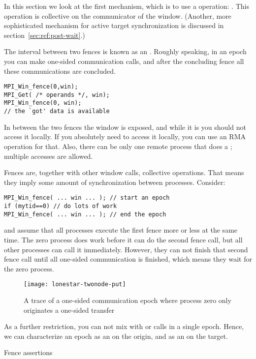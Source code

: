 In this section we look at the first mechanism,
which is to use a  operation: .
This operation is collective on the communicator of the window.
(Another, more sophisticated mechanism for active target synchronization
is discussed in section~\ref{sec:ref:post-wait}.)

The interval between two fences is known as an .
Roughly speaking, in an epoch you can make one-sided communication calls,
and after the concluding fence all these communications are concluded.
\begin{lstlisting}
MPI_Win_fence(0,win);
MPI_Get( /* operands */, win);
MPI_Win_fence(0, win);
// the `got' data is available
\end{lstlisting}
In between the two fences the window is exposed,
and while it is you should not access it locally.
If you absolutely need to access it
locally, you can use an \ac{RMA} operation for that. Also, there can be only one
remote process that does a ; multiple  accesses are allowed.

Fences are, together with other window calls, collective operations. That means they 
imply some amount of synchronization between processes. Consider:
\begin{lstlisting}
MPI_Win_fence( ... win ... ); // start an epoch
if (mytid==0) // do lots of work
MPI_Win_fence( ... win ... ); // end the epoch
\end{lstlisting}
and assume that all processes execute the first fence more or less at the same time.
The zero process does work before it can do the second fence call, but all other
processes can call it immediately. However, they can not finish that second fence call
until all one-sided communication is finished, which means they wait for the zero process.

\begin{figure}[ht]
  \texttt{[image: lonestar-twonode-put]}%
  \caption{A trace of a one-sided communication epoch where process zero only originates
  a one-sided transfer}
  \label{fig:putblock}
\end{figure}

As a further restriction, you can not mix  with 
or  calls in a single epoch. Hence, we can
characterize an epoch as an  on the
origin, and as an  on the target.

 {Fence assertions}

